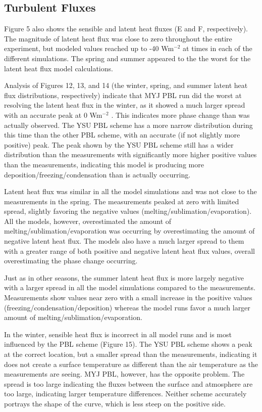 \subsection{Turbulent Fluxes}
Figure 5 also shows the sensible and latent heat fluxes (E and F, respectively). The magnitude of latent heat flux was close to zero throughout the entire experiment, but modeled values reached up to -40 Wm$^{-2}$   at times in each of the different simulations. The spring and summer appeared to the the worst for the latent heat flux model calculations. 

Analysis of Figures 12, 13, and 14 (the winter, spring, and summer latent heat flux distributions, respectively) indicate that MYJ PBL run did the worst at resolving the latent heat flux in the winter, as it showed a much larger spread with an accurate peak at 0 Wm$^{-2}$  . This indicates more phase change than was actually observed. The YSU PBL scheme has a more narrow distribution during this time than the other PBL scheme, with an accurate (if not slightly more positive) peak. The peak shown by the YSU PBL scheme still has a wider distribution than the measurements with significantly more higher positive values than the measurements, indicating this model is producing more deposition/freezing/condensation than is actually occurring.

Latent heat flux was similar in all the model simulations and was not close to the measurements in the spring. The measurements peaked at zero with limited spread, slightly favoring the negative values (melting/sublimation/evaporation). All the models, however, overestimated the amount of melting/sublimation/evaporation was occurring by overestimating the amount of negative latent heat flux. The models also have a much larger spread to them with a greater range of both positive and negative latent heat flux values, overall overestimating the phase change occurring.

Just as in other seasons, the summer latent heat flux is more largely negative with a larger spread in all the model simulations compared to the measurements. Measurements show values near zero with a small increase in the positive values (freezing/condensation/deposition) whereas the model runs favor a much larger amount of melting/sublimation/evaporation.

In the winter, sensible heat flux is incorrect in all model runs and is  most influenced by the PBL scheme (Figure 15). The YSU PBL scheme shows a peak at the correct location, but a smaller spread than the measurements, indicating it does not create a surface temperature as different than the air temperature as the measurements are seeing. MYJ PBL, however, has the opposite problem. The spread is too large indicating the fluxes between the surface and atmosphere are too large, indicating larger temperature differences. Neither scheme accurately portrays the shape of the curve, which is less steep on the positive side.

